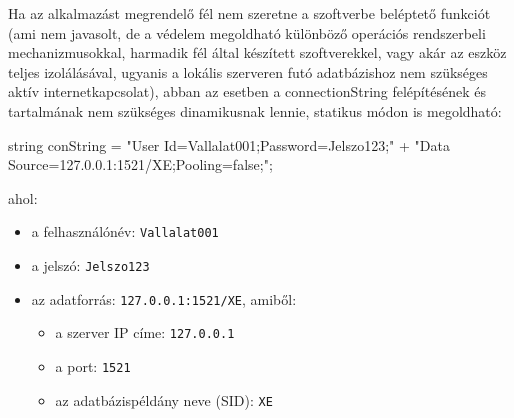 Ha az alkalmazást megrendelő fél nem szeretne a szoftverbe beléptető funkciót (ami nem javasolt, de a védelem megoldható különböző operációs rendszerbeli mechanizmusokkal, harmadik fél által készített szoftverekkel, vagy akár az eszköz teljes izolálásával, ugyanis a lokális szerveren futó adatbázishoz nem szükséges aktív internetkapcsolat), abban az esetben a connectionString felépítésének és tartalmának nem szükséges dinamikusnak lennie, statikus módon is megoldható:

\begin{cpp}
string conString = "User Id=Vallalat001;Password=Jelszo123;" +
                   "Data Source=127.0.0.1:1521/XE;Pooling=false;";
\end{cpp}

ahol:
\begin{itemize}
	\item a felhasználónév: \texttt{Vallalat001}
	\item a jelszó: \texttt{Jelszo123}
	\item az adatforrás: \texttt{127.0.0.1:1521/XE}, amiből:
	\begin{itemize}
		\item a szerver IP címe: \texttt{127.0.0.1}
		\item a port: \texttt{1521}
		\item az adatbázispéldány neve (SID): \texttt{XE}
	\end{itemize}
\end{itemize}



